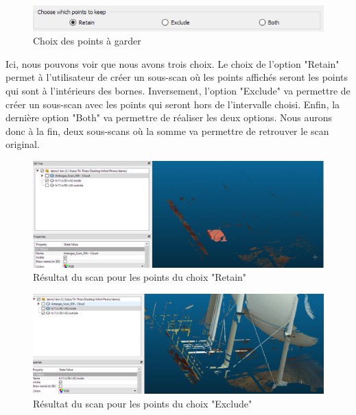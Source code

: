 \documentclass[12pt,titlepage,french]{article}
\begin{document}
\begin{figure}[H]
 \caption{\label{} Choix des points à garder}
 \begin{center}
 \includegraphics[width=1\textwidth]{./img/choix.PNG}
  \end{center}
\end{figure}

Ici, nous pouvons voir que nous avons trois choix.  Le choix de l'option "Retain" permet à l'utilisateur de créer un sous-scan où les points affichés seront les points qui sont à l'intérieurs des bornes. Inversement, l'option "Exclude" va permettre de créer un sous-scan avec les points qui seront hors de l'intervalle choisi. Enfin, la dernière option "Both" va permettre de réaliser les deux options. Nous aurons donc à la fin, deux sous-scans où la somme va permettre de retrouver le scan original.

\begin{figure}[H]
 \caption{\label{} Résultat du scan pour les points du choix "Retain"}
 \begin{center}
 \includegraphics[width=1\textwidth]{./img/choix_ex_1.PNG}
  \end{center}
\end{figure}

\begin{figure}[H]
 \caption{\label{}  Résultat du scan pour les points du choix "Exclude"}
 \begin{center}
 \includegraphics[width=1\textwidth]{./img/choix_ex_2.PNG}
  \end{center}
\end{figure}
\end{document}
